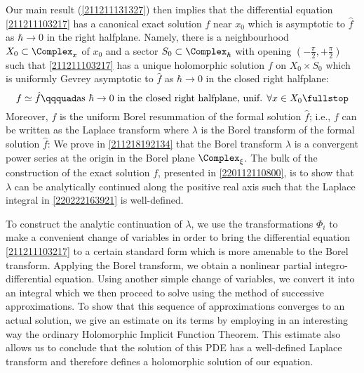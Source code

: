 \documentclass[11pt]{article}
\begin{document}
Our main result (\autoref{211211131327}) then implies that the differential equation \eqref{211211103217} has a canonical exact solution $f$ near $x_0$ which is asymptotic to $\hat{f}$ as $\hbar \to 0$ in the right halfplane.
Namely, there is a neighbourhood $X_0 \subset \Complex_x$ of $x_0$ and a sector $S_0 \subset \Complex_\hbar$ with opening $(-\tfrac{\pi}{2},+\tfrac{\pi}{2})$ such that \eqref{211211103217} has a unique holomorphic solution $f$ on $X_0 \times S_0$ which is uniformly Gevrey asymptotic to $\hat{f}$ as $\hbar \to 0$ in the closed right halfplane:
\vspace{-5pt}
\begin{equation}
\label{220222184439}
	f \simeq \hat{f}
\qqquad
	\text{as $\hbar \to 0$ in the closed right halfplane, unif. $\forall x \in X_0$\fullstop}
\vspace{-5pt}
\end{equation}
Moreover, $f$ is the uniform Borel resummation of the formal solution $\hat{f}$; i.e., $f$ can be written as the Laplace transform
\vspace{-7.5pt}
where $\lambda$ is the Borel transform of the formal solution $\hat{f}$:
\vspace{-5pt}
We prove in \autoref{211218192134} that the Borel transform $\lambda$ is a convergent power series at the origin in the Borel plane $\Complex_\xi$.
The bulk of the construction of the exact solution $f$, presented in \autoref{220112110800}, is to show that $\lambda$ can be analytically continued along the positive real axis such that the Laplace integral in \eqref{220222163921} is well-defined.

To construct the analytic continuation of $\lambda$, we use the transformations $\Phi_i$ to make a convenient change of variables in order to bring the differential equation \eqref{211211103217} to a certain standard form which is more amenable to the Borel transform.
Applying the Borel transform, we obtain a nonlinear partial integro-differential equation.
Using another simple change of variables, we convert it into an integral which we then proceed to solve using the method of successive approximations.
To show that this sequence of approximations converges to an actual solution, we give an estimate on its terms by employing in an interesting way the ordinary Holomorphic Implicit Function Theorem.
This estimate also allows us to conclude that the solution of this PDE has a well-defined Laplace transform and therefore defines a holomorphic solution of our equation.
\end{document}
